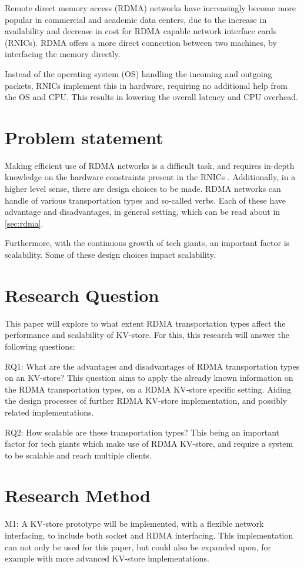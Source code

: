 Remote direct memory access (RDMA) networks have increasingly become more popular in commercial and academic data centers, due to the increase in availability and decrease in cost for RDMA capable network interface cards (RNICs).
RDMA offers a more direct connection between two machines, by interfacing the memory directly.

Instead of the operating system (OS) handling the incoming and outgoing packets, RNICs implement this in hardware, requiring no additional help from the OS and CPU. This results in lowering the overall latency and CPU overhead.

\section{Problem statement}
Making efficient use of RDMA networks is a difficult task, and requires in-depth knowledge on the hardware constraints present in the RNICs \cite{chen2019scalable}.
Additionally, in a higher level sense, there are design choices to be made.
RDMA networks can handle of various transportation types and so-called verbs.
Each of these have advantage and disadvantages, in general setting, which can be read about in \ref{sec:rdma}.

Furthermore, with the continuous growth of tech giants, an important factor is scalability.
Some of these design choices impact scalability.

\section{Research Question}
This paper will explore to what extent RDMA transportation types affect the performance and scalability of KV-store.
For this, this research will answer the following questions:

RQ1: What are the advantages and disadvantages of RDMA transportation types on an KV-store?
This question aims to apply the already known information on the RDMA transportation types, on a RDMA KV-store specific setting.
Aiding the design processes of further RDMA KV-store implementation, and possibly related implementations.

RQ2: How scalable are these transportation types?%
This being an important factor for tech giants which make use of RDMA KV-store, and require a system to be scalable and reach multiple clients.

\section{Research Method}
M1: A KV-store prototype will be implemented, with a flexible network interfacing, to include both socket and RDMA interfacing.
This implementation can not only be used for this paper, but could also be expanded upon, for example with more advanced KV-store implementations.

